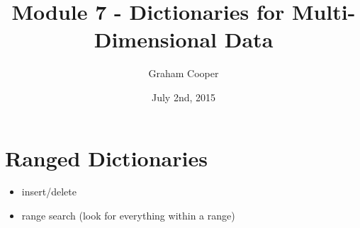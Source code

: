 \documentclass[12pt]{article}
\title{\vspace{-15ex}Module 7 - Dictionaries for Multi-Dimensional Data\vspace{-1ex}}
\date{July 2nd, 2015}
\author{Graham Cooper}
\begin{document}
	\maketitle
	
	\section*{Ranged Dictionaries}
	\begin{itemize}
		\item insert/delete
		\item range search (look for everything within a range)
	\end{itemize}
\end{document}
